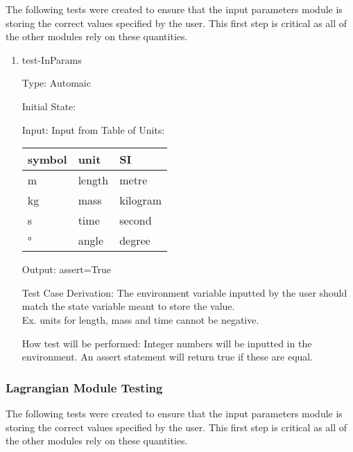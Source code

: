 \documentclass[12pt, titlepage]{article}
\begin{document}
{The following tests were created to ensure that the input parameters module is 
storing the correct values specified by the user. This first step is critical 
as all of the other modules rely on these quantities.

\begin{enumerate}				
\item{test-InParams\\}

Type: Automaic 

Initial State: 

Input: Input from Table of Units:\\
  \noindent \begin{tabular}{l l l} 
    \toprule		
    \textbf{symbol} & \textbf{unit} & \textbf{SI}\\
    \midrule 
    \si{\metre} & length & metre\\
    \si{\kilogram} & mass & kilogram\\
    \si{\second} & time & second\\
    \si{\degree} & angle & degree\\
    \bottomrule
  \end{tabular}

Output: assert=True

Test Case Derivation: The environment variable inputted by the user should 
match the state variable meant to store the value.\\
Ex. units for length, mass and time cannot be negative.

How test will be performed: Integer numbers will be inputted in the environment. 
An assert statement will return true if these 
are equal.

    
\end{enumerate}

\subsubsection{\progname Lagrangian Module Testing}

The following tests were created to ensure that the input parameters module is 
storing the correct values specified by the user. This first step is critical 
as all of the other modules rely on these quantities.

}
\end{document}
